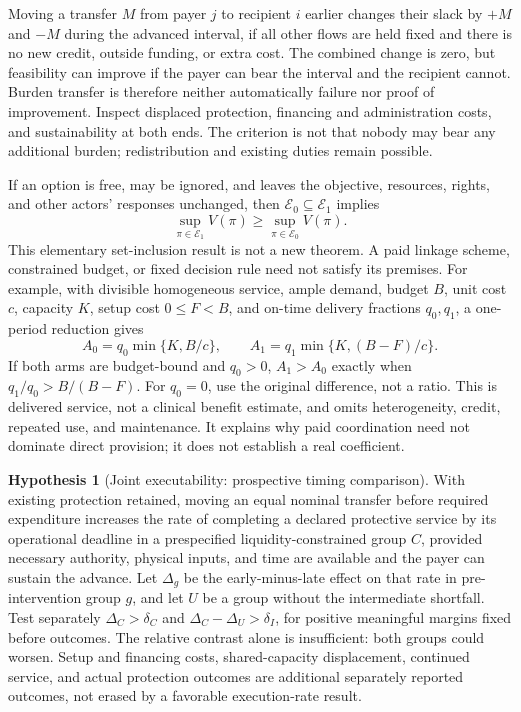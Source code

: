 \documentclass[11pt,a4paper]{article}
\numberwithin{equation}{section}
\theoremstyle{definition}
\newtheorem{hypothesis}[definition]{Hypothesis}
\theoremstyle{plain}
\theoremstyle{remark}
\begin{document}
Moving a transfer $M$ from payer $j$ to recipient $i$ earlier changes their slack by $+M$ and $-M$ during the advanced interval, if all other flows are held fixed and there is no new credit, outside funding, or extra cost. The combined change is zero, but feasibility can improve if the payer can bear the interval and the recipient cannot. Burden transfer is therefore neither automatically failure nor proof of improvement. Inspect displaced protection, financing and administration costs, and sustainability at both ends. The criterion is not that nobody may bear any additional burden; redistribution and existing duties remain possible.

If an option is free, may be ignored, and leaves the objective, resources, rights, and other actors' responses unchanged, then $\mathcal E_0\subseteq\mathcal E_1$ implies
\begin{equation}
\sup_{\pi\in\mathcal E_1}V(\pi)\ge\sup_{\pi\in\mathcal E_0}V(\pi).
\end{equation}
This elementary set-inclusion result is not a new theorem. A paid linkage scheme, constrained budget, or fixed decision rule need not satisfy its premises. For example, with divisible homogeneous service, ample demand, budget $B$, unit cost $c$, capacity $K$, setup cost $0\le F<B$, and on-time delivery fractions $q_0,q_1$, a one-period reduction gives
\begin{equation}
A_0=q_0\min\{K,B/c\},\qquad A_1=q_1\min\{K,(B-F)/c\}.
\end{equation}
If both arms are budget-bound and $q_0>0$, $A_1>A_0$ exactly when $q_1/q_0>B/(B-F)$. For $q_0=0$, use the original difference, not a ratio. This is delivered service, not a clinical benefit estimate, and omits heterogeneity, credit, repeated use, and maintenance. It explains why paid coordination need not dominate direct provision; it does not establish a real coefficient.

\begin{hypothesis}[Joint executability: prospective timing comparison]
\label{hyp:timing}
With existing protection retained, moving an equal nominal transfer before required expenditure increases the rate of completing a declared protective service by its operational deadline in a prespecified liquidity-constrained group $C$, provided necessary authority, physical inputs, and time are available and the payer can sustain the advance. Let $\Delta_g$ be the early-minus-late effect on that rate in pre-intervention group $g$, and let $U$ be a group without the intermediate shortfall. Test separately $\Delta_C>\delta_C$ and $\Delta_C-\Delta_U>\delta_I$, for positive meaningful margins fixed before outcomes. The relative contrast alone is insufficient: both groups could worsen. Setup and financing costs, shared-capacity displacement, continued service, and actual protection outcomes are additional separately reported outcomes, not erased by a favorable execution-rate result.
\end{hypothesis}
\end{document}
